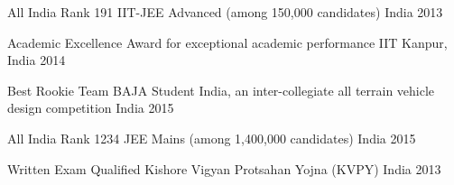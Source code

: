 
\begin{cvhonors}
	
	\cvhonor
	{All India Rank 191 } %
	{IIT-JEE Advanced (among 150,000 candidates)} %
	{India} %
	{2013} %
	
	\cvhonor
	{Academic Excellence Award} %
	{for exceptional academic performance} %
	{IIT Kanpur, India} %
	{2014} %
	
	\cvhonor
	{Best Rookie Team} %
	{BAJA Student India, an inter-collegiate all terrain vehicle design competition} %
	{India} %
	{2015} %
	
	\cvhonor
	{All India Rank 1234} %
	{JEE Mains (among 1,400,000 candidates)} %
	{India} %
	{2015} %
	
	\cvhonor
	{Written Exam Qualified} %
	{Kishore Vigyan Protsahan Yojna (KVPY)} %
	{India} %
	{2013} %
	
\end{cvhonors}
